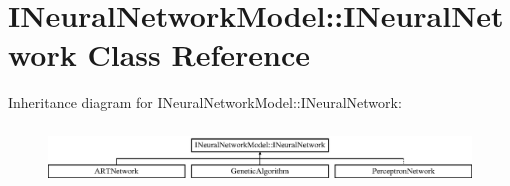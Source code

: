 \hypertarget{class_i_neural_network_model_1_1_i_neural_network}{}\section{I\+Neural\+Network\+Model\+:\+:I\+Neural\+Network Class Reference}
\label{class_i_neural_network_model_1_1_i_neural_network}
Inheritance diagram for I\+Neural\+Network\+Model\+:\+:I\+Neural\+Network\+:\begin{figure}[H]
\begin{center}
\leavevmode
\includegraphics[height=1.588652cm]{class_i_neural_network_model_1_1_i_neural_network}
\end{center}
\end{figure}
